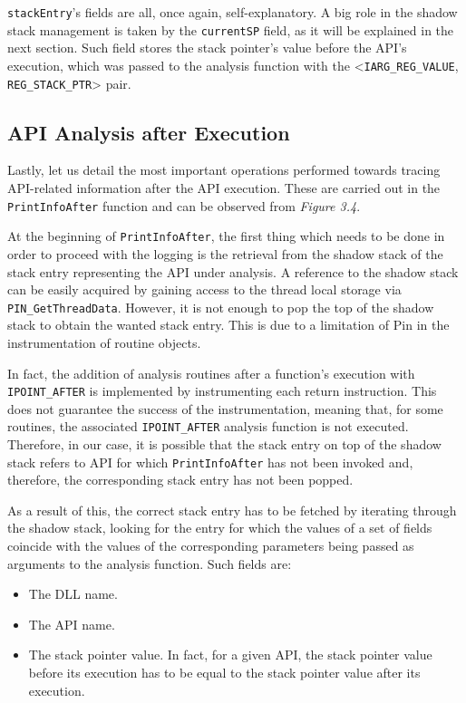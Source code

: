 \texttt{stackEntry}'s fields are all, once again, self-explanatory. A big role in the shadow stack management is taken by the \texttt{currentSP} field, as it will be explained in the next section. Such field stores the stack pointer's value before the API's execution, which was passed to the analysis function with the <\texttt{IARG\_REG\_VALUE}, \texttt{REG\_STACK\_PTR}> pair.

\subsection{API Analysis after Execution}

Lastly, let us detail the most important operations performed towards tracing API-related information after the API execution. These are carried out in the \texttt{PrintInfoAfter} function and can be observed from \textit{Figure 3.4}.

At the beginning of \texttt{PrintInfoAfter}, the first thing which needs to be done in order to proceed with the logging is the retrieval from the shadow stack of the stack entry representing the API under analysis. A reference to the shadow stack can be easily acquired by gaining access to the thread local storage via \texttt{PIN\_GetThreadData}. However, it is not enough to pop the top of the shadow stack to obtain the wanted stack entry. This is due to a limitation of Pin in the instrumentation of routine objects.

In fact, the addition of analysis routines after a function's execution with \texttt{IPOINT\_AFTER} is implemented by instrumenting each return instruction. This does not guarantee the success of the instrumentation, meaning that, for some routines, the associated \texttt{IPOINT\_AFTER} analysis function is not executed. Therefore, in our case, it is possible that the stack entry on top of the shadow stack refers to API for which \texttt{PrintInfoAfter} has not been invoked and, therefore, the corresponding stack entry has not been popped.

As a result of this, the correct stack entry has to be fetched by iterating through the shadow stack, looking for the entry for which the values of a set of fields coincide with the values of the corresponding parameters being passed as arguments to the analysis function. Such fields are:
\begin{itemize}
\item The DLL name.
\item The API name.
\item The stack pointer value. In fact, for a given API, the stack pointer value before its execution has to be equal to the stack pointer value after its execution.
\end{itemize} 

